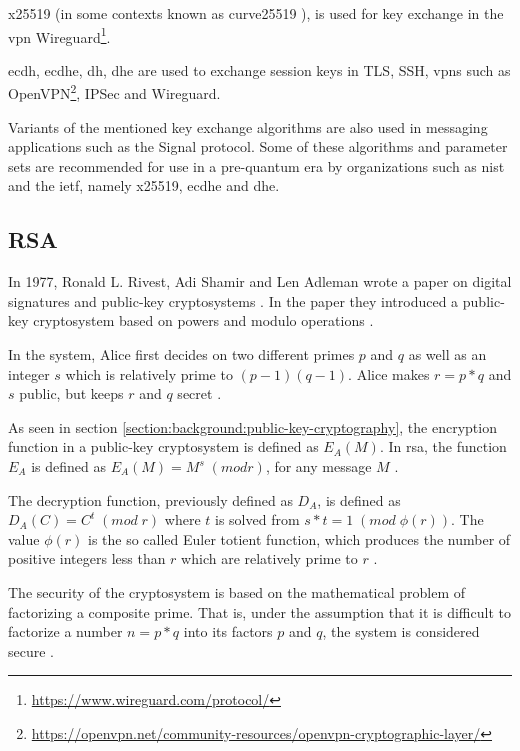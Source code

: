 \gls{x25519} (in some contexts known as \gls{curve25519} \cite{25519naming}), is used for key exchange in the \gls{vpn} Wireguard\footnote{\href{https://www.wireguard.com/protocol/}{https://www.wireguard.com/protocol/}}.

\gls{ecdh}, \gls{ecdhe}, \gls{dh}, \gls{dhe} are used to exchange session keys in TLS\cite{rfc8446}, SSH\cite{williams2011}, \glspl{vpn} such as OpenVPN\footnote{\href{https://openvpn.net/community-resources/openvpn-cryptographic-layer/}{https://openvpn.net/community-resources/openvpn-cryptographic-layer/}}, IPSec\cite{rfc2409} and Wireguard.

Variants of the mentioned key exchange algorithms are also used in messaging applications such as the Signal protocol\cite{gordon2017}. Some of these algorithms and parameter sets are recommended for use in a pre-quantum era by organizations such as \gls{nist} and the \gls{ietf}, namely \gls{x25519}\cite{rfc7748}, \gls{ecdhe}\cite{nist2019} and \gls{dhe}\cite{nist2019}.

\subsection{RSA}

In 1977, Ronald L. Rivest, Adi Shamir and Len Adleman wrote a paper on digital signatures and public-key cryptosystems \cite{rsa1977}. In the paper they introduced a public-key cryptosystem based on powers and modulo operations \cite{rsa1977}.

In the system, Alice first decides on two different primes $p$ and $q$ as well as an integer $s$ which is relatively prime to $(p-1)(q-1)$. Alice makes $r=p*q$ and $s$ public, but keeps $r$ and $q$ secret \cite{rsa1977}.

As seen in section \ref{section:background:public-key-cryptography}, the encryption function in a public-key cryptosystem is defined as $E_A(M)$. In \gls{rsa}, the function $E_A$ is defined as $E_A(M)=M^s\;(mod r)$, for any message $M$ \cite{rsa1977}.

The decryption function, previously defined as $D_A$, is defined as $D_A(C)=C^t\;(mod\;r)$ where $t$ is solved from $s*t=1\;(mod\;\phi(r))$. The value $\phi(r)$ is the so called Euler totient function, which produces the number of positive integers less than $r$ which are relatively prime to $r$ \cite{rsa1977}.

The security of the cryptosystem is based on the mathematical problem of factorizing a composite prime. That is, under the assumption that it is difficult to factorize a number $n=p*q$ into its factors $p$ and $q$, the system is considered secure \cite{rsa1977}.


